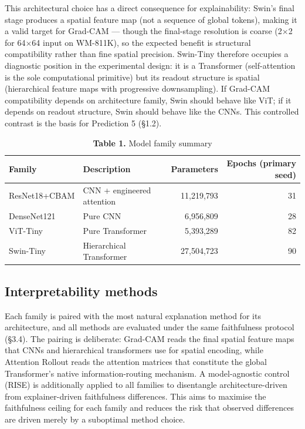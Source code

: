 \documentclass[11pt,a4paper]{article}
\begin{document}
This architectural choice has a direct consequence for explainability: Swin's final stage produces a spatial feature map (not a sequence of global tokens), making it a valid target for Grad-CAM --- though the final-stage resolution is coarse (2$\times$2 for 64$\times$64 input on WM-811K), so the expected benefit is structural compatibility rather than fine spatial precision. Swin-Tiny therefore occupies a diagnostic position in the experimental design: it is a Transformer (self-attention is the sole computational primitive) but its readout structure is spatial (hierarchical feature maps with progressive downsampling). If Grad-CAM compatibility depends on architecture family, Swin should behave like ViT; if it depends on readout structure, Swin should behave like the CNNs. This controlled contrast is the basis for Prediction 5 (\S{}1.2).

\begin{table}[htbp]
\centering
\small
\caption{\textbf{Table 1.} Model family summary}
\begin{tabular}{llrr}
\toprule
Family & Description & Parameters & Epochs (primary seed) \\
\midrule
ResNet18+CBAM & CNN + engineered attention & 11,219,793 & 31 \\
DenseNet121 & Pure CNN & 6,956,809 & 28 \\
ViT-Tiny & Pure Transformer & 5,393,289 & 82 \\
Swin-Tiny & Hierarchical Transformer & 27,504,723 & 90 \\
\bottomrule
\end{tabular}
\end{table}

\subsection{Interpretability methods}

Each family is paired with the most natural explanation method for its architecture, and all methods are evaluated under the same faithfulness protocol (\S{}3.4). The pairing is deliberate: Grad-CAM reads the final spatial feature maps that CNNs and hierarchical transformers use for spatial encoding, while Attention Rollout reads the attention matrices that constitute the global Transformer's native information-routing mechanism. A model-agnostic control (RISE) is additionally applied to all families to disentangle architecture-driven from explainer-driven faithfulness differences. This aims to maximise the faithfulness ceiling for each family and reduces the risk that observed differences are driven merely by a suboptimal method choice.
\end{document}
